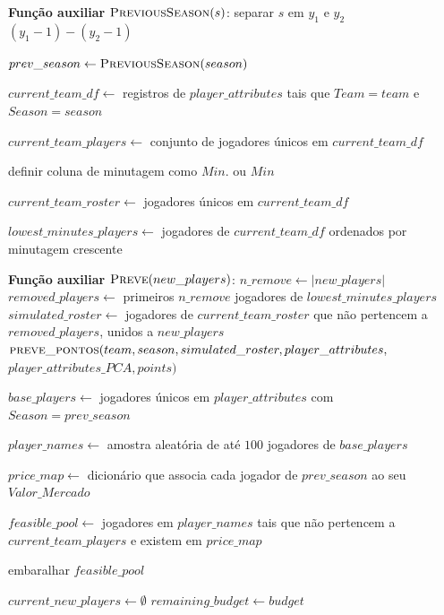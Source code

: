 \begin{breakablealgorithm}
\label{alg:busca_local_best}
\begin{algorithmic}[1]


\Statex \textbf{Função auxiliar} $\textsc{PreviousSeason}(s)$:
\State separar $s$ em $y_1$ e $y_2$
\State \Return $(y_1 - 1)-(y_2 - 1)$

\State $prev\_season \gets \textsc{PreviousSeason}(season)$

\State $current\_team\_df \gets$ registros de $player\_attributes$ tais que $Team = team$ e $Season = season$

\State $current\_team\_players \gets$ conjunto de jogadores únicos em $current\_team\_df$

\State definir coluna de minutagem como $Min.$ ou $Min$

\State $current\_team\_roster \gets$ jogadores únicos em $current\_team\_df$

\State $lowest\_minutes\_players \gets$ jogadores de $current\_team\_df$ ordenados por minutagem crescente

\Statex \textbf{Função auxiliar} $\textsc{Preve}(new\_players)$:
\State $n\_remove \gets |new\_players|$
\State $removed\_players \gets$ primeiros $n\_remove$ jogadores de $lowest\_minutes\_players$
\State $simulated\_roster \gets$ jogadores de $current\_team\_roster$ que não pertencem a $removed\_players$, unidos a $new\_players$
\State \Return $\textsc{preve\_pontos}(team, season, simulated\_roster, player\_attributes,$
\Statex \hspace{\algorithmicindent} $player\_attributes\_PCA, points)$

\State $base\_players \gets$ jogadores únicos em $player\_attributes$ com $Season = prev\_season$

\State $player\_names \gets$ amostra aleatória de até $100$ jogadores de $base\_players$

\State $price\_map \gets$ dicionário que associa cada jogador de $prev\_season$ ao seu $Valor\_Mercado$

\State $feasible\_pool \gets$ jogadores em $player\_names$ tais que não pertencem a $current\_team\_players$ e existem em $price\_map$

\State embaralhar $feasible\_pool$

\State $current\_new\_players \gets \emptyset$
\State $remaining\_budget \gets budget$


\end{algorithmic}
\end{breakablealgorithm}
